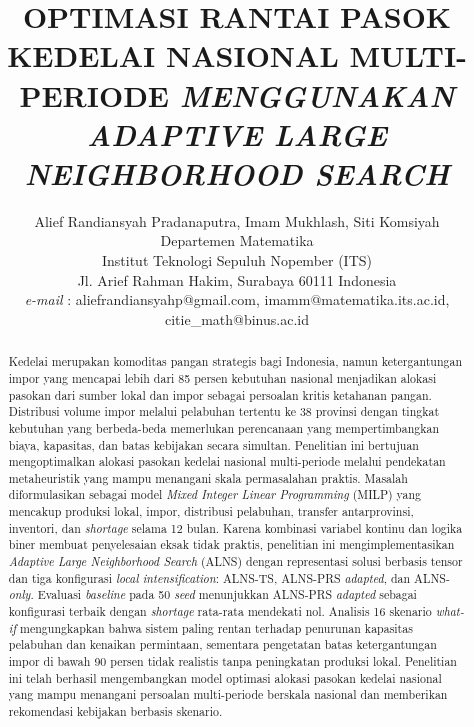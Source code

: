 \documentclass[journal]{IEEEtran}
\theoremstyle{definition}
\theoremstyle{definition}
\theoremstyle{plain}
\begin{document}
    \title{OPTIMASI RANTAI PASOK KEDELAI NASIONAL MULTI-PERIODE \textit{MENGGUNAKAN ADAPTIVE LARGE NEIGHBORHOOD SEARCH}\\ \vspace{12pt}}

    \author{Alief Randiansyah Pradanaputra, Imam Mukhlash, Siti Komsiyah\\
    Departemen Matematika\\Institut Teknologi Sepuluh Nopember (ITS)\\
    Jl. Arief Rahman Hakim, Surabaya 60111 Indonesia\\
    \textit{e-mail} : aliefrandiansyahp@gmail.com, imamm@matematika.its.ac.id, citie\_math@binus.ac.id\\ \vspace{-1em}}

     \maketitle

    \begin{abstract}
Kedelai merupakan komoditas pangan strategis bagi Indonesia, namun ketergantungan impor yang mencapai lebih dari 85 persen kebutuhan nasional menjadikan alokasi pasokan dari sumber lokal dan impor sebagai persoalan kritis ketahanan pangan. Distribusi volume impor melalui pelabuhan tertentu ke 38 provinsi dengan tingkat kebutuhan yang berbeda-beda memerlukan perencanaan yang mempertimbangkan biaya, kapasitas, dan batas kebijakan secara simultan. Penelitian ini bertujuan mengoptimalkan alokasi pasokan kedelai nasional multi-periode melalui pendekatan metaheuristik yang mampu menangani skala permasalahan praktis. Masalah diformulasikan sebagai model \textit{Mixed Integer Linear Programming} (MILP) yang mencakup produksi lokal, impor, distribusi pelabuhan, transfer antarprovinsi, inventori, dan \textit{shortage} selama 12 bulan. Karena kombinasi variabel kontinu dan logika biner membuat penyelesaian eksak tidak praktis, penelitian ini mengimplementasikan \textit{Adaptive Large Neighborhood Search} (ALNS) dengan representasi solusi berbasis tensor dan tiga konfigurasi \textit{local intensification}: ALNS-TS, ALNS-PRS \textit{adapted}, dan ALNS-\textit{only}. Evaluasi \textit{baseline} pada 50 \textit{seed} menunjukkan ALNS-PRS \textit{adapted} sebagai konfigurasi terbaik dengan \textit{shortage} rata-rata mendekati nol. Analisis 16 skenario \textit{what-if} mengungkapkan bahwa sistem paling rentan terhadap penurunan kapasitas pelabuhan dan kenaikan permintaan, sementara pengetatan batas ketergantungan impor di bawah 90 persen tidak realistis tanpa peningkatan produksi lokal. Penelitian ini telah berhasil mengembangkan model optimasi alokasi pasokan kedelai nasional yang mampu menangani persoalan multi-periode berskala nasional dan memberikan rekomendasi kebijakan berbasis skenario.
\end{abstract}
\end{document}
